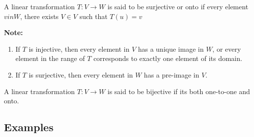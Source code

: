 \documentclass[english,course,fleqn]{lecture}
\begin{document}
\begin{definition}
  A linear transformation $T:V\rightarrow W$ is said to be surjective or onto if every element $v in W$,
  there exists $V \in V$ such that $T(u) = v$
\end{definition}

\textbf{Note:}

\begin{enumerate}
  \item If $T$ is injective, then every element in $V$ has a unique image in $W$,
    or every element in the range of $T$ corresponds to exactly one element of its domain.
  \item If $T$ is surjective, then every element in $W$ has a pre-image in $V$.
\end{enumerate}

\begin{definition}
  A linear transformation $T:V \rightarrow W$ is said to be bijective if its both one-to-one and onto.
\end{definition}

\subsection{Examples}
\end{document}
